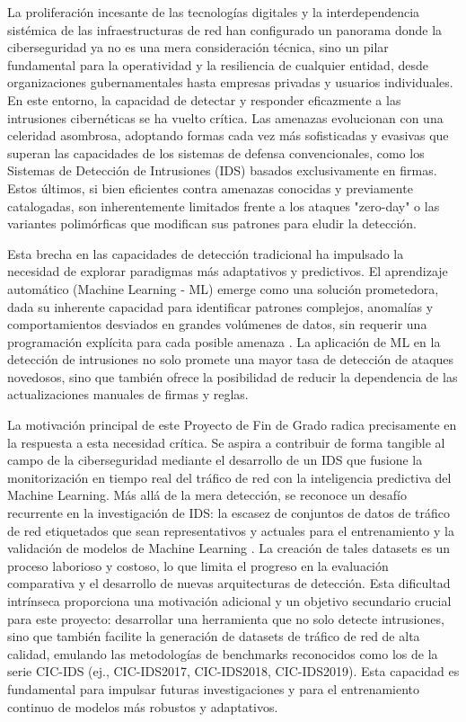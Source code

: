 La proliferación incesante de las tecnologías digitales y la interdependencia sistémica de las infraestructuras de red han configurado un panorama donde la ciberseguridad ya no es una mera consideración técnica, sino un pilar fundamental para la operatividad y la resiliencia de cualquier entidad, desde organizaciones gubernamentales hasta empresas privadas y usuarios individuales. En este entorno, la capacidad de detectar y responder eficazmente a las intrusiones cibernéticas se ha vuelto crítica. Las amenazas evolucionan con una celeridad asombrosa, adoptando formas cada vez más sofisticadas y evasivas que superan las capacidades de los sistemas de defensa convencionales, como los Sistemas de Detección de Intrusiones (IDS) basados exclusivamente en firmas. Estos últimos, si bien eficientes contra amenazas conocidas y previamente catalogadas, son inherentemente limitados frente a los ataques "zero-day" o las variantes polimórficas que modifican sus patrones para eludir la detección.

Esta brecha en las capacidades de detección tradicional ha impulsado la necesidad de explorar paradigmas más adaptativos y predictivos. El aprendizaje automático (Machine Learning - ML) emerge como una solución prometedora, dada su inherente capacidad para identificar patrones complejos, anomalías y comportamientos desviados en grandes volúmenes de datos, sin requerir una programación explícita para cada posible amenaza \cite{Zhang2022AICybersecurity}. La aplicación de ML en la detección de intrusiones no solo promete una mayor tasa de detección de ataques novedosos, sino que también ofrece la posibilidad de reducir la dependencia de las actualizaciones manuales de firmas y reglas.

La motivación principal de este Proyecto de Fin de Grado radica precisamente en la respuesta a esta necesidad crítica. Se aspira a contribuir de forma tangible al campo de la ciberseguridad mediante el desarrollo de un IDS que fusione la monitorización en tiempo real del tráfico de red con la inteligencia predictiva del Machine Learning. Más allá de la mera detección, se reconoce un desafío recurrente en la investigación de IDS: la escasez de conjuntos de datos de tráfico de red etiquetados que sean representativos y actuales para el entrenamiento y la validación de modelos de Machine Learning \cite{PolaniaArias2021EvaluacionMLIDS}. La creación de tales datasets es un proceso laborioso y costoso, lo que limita el progreso en la evaluación comparativa y el desarrollo de nuevas arquitecturas de detección. Esta dificultad intrínseca proporciona una motivación adicional y un objetivo secundario crucial para este proyecto: desarrollar una herramienta que no solo detecte intrusiones, sino que también facilite la generación de datasets de tráfico de red de alta calidad, emulando las metodologías de benchmarks reconocidos como los de la serie CIC-IDS (ej., CIC-IDS2017, CIC-IDS2018, CIC-IDS2019). Esta capacidad es fundamental para impulsar futuras investigaciones y para el entrenamiento continuo de modelos más robustos y adaptativos.

